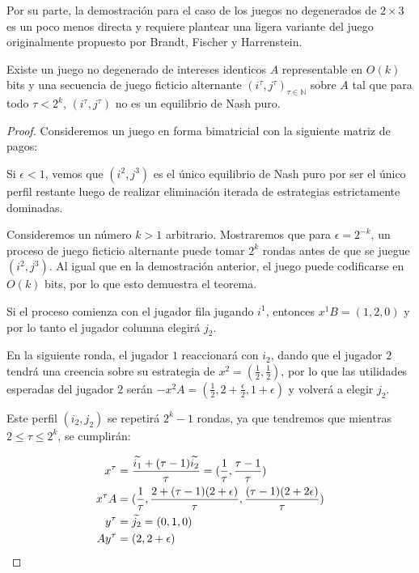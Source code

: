 Por su parte, la demostración para el caso de los juegos no degenerados de $2 \times 3$ es un poco menos directa y requiere plantear una ligera variante del juego originalmente propuesto por Brandt, Fischer y Harrenstein. 

\begin{theorem} \label{teorema:afp:velocidad:nondegen}
    Existe un juego no degenerado de intereses identicos $A$ representable en $O(k)$ bits y una secuencia de juego ficticio alternante $(i^\tau, j^\tau)_{\tau \in \mathbb{N}}$ sobre $A$ tal que para todo $\tau < 2^k$, $(i^\tau, j^\tau)$ no es un equilibrio de Nash puro.
\end{theorem}

\begin{proof}
    Consideremos un juego en forma bimatricial con la siguiente matriz de pagos:

    

    Si $\epsilon < 1$, vemos que $(i^2, j^3)$ es el único equilibrio de Nash puro por ser el único perfil restante luego de realizar eliminación iterada de estrategias estrictamente dominadas.

    Consideremos un número $k > 1$ arbitrario. Mostraremos que para $\epsilon = 2^{-k}$, un proceso de juego ficticio alternante puede tomar $2^k$ rondas antes de que se juegue $(i^2, j^3)$. Al igual que en la demostración anterior, el juego puede codificarse en $O(k)$ bits, por lo que esto demuestra el teorema.

    Si el proceso comienza con el jugador fila jugando $i^1$, entonces $x^1B = (1, 2, 0)$ y por lo tanto el jugador columna elegirá $j_2$.

    En la siguiente ronda, el jugador $1$ reaccionará con $i_2$, dando que el jugador $2$ tendrá una creencia sobre su estrategia de $x^2 = (\frac{1}{2},\frac{1}{2})$, por lo que las utilidades esperadas del jugador $2$ serán $-x^2A = (\frac{1}{2}, 2 + \frac{\epsilon}{2}, 1 + \epsilon)$ y volverá a elegir $j_2$.

    Este perfil $(i_2, j_2)$ se repetirá $2^k - 1$ rondas, ya que tendremos que mientras $2 \le \tau \le 2^k$, se cumplirán:

    \begin{align*}
        x^\tau     &= \frac{\widetilde{i_1} + (\tau - 1) \widetilde{i_2}}{\tau} = (\frac{1}{\tau}, \frac{\tau - 1}{\tau}) \\
        x^{\tau}A &= (\frac{1}{\tau}, \frac{2 + (\tau - 1)(2 + \epsilon)}{\tau}, \frac{(\tau - 1)(2 + 2 \epsilon)}{\tau}) \\
        y^\tau     &= \widetilde{j_2} = (0, 1, 0) \\
        Ay^\tau    &= (2, 2 + \epsilon) \\
    \end{align*}


\end{proof}
